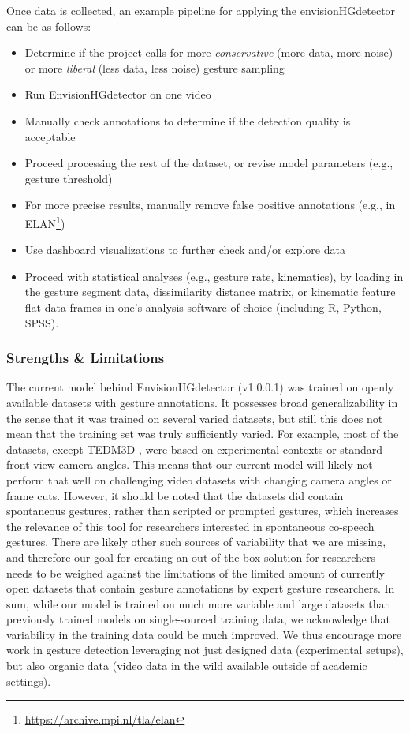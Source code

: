\documentclass[11pt,smallheadings,cleardoublepage=empty,tocflat,numbers=noenddot,twoside,captions=tableheading]{scrbook}
\begin{document}
\begin{refsection}
Once data is collected, an example pipeline for applying the envisionHGdetector can be as follows:
\begin{itemize}
\item Determine if the project calls for more \textit{conservative} (more data, more noise) or more \textit{liberal} (less data, less noise) gesture sampling
\item Run EnvisionHGdetector on one video
\item Manually check annotations to determine if the detection quality is acceptable
\item Proceed processing the rest of the dataset, or revise model parameters (e.g., gesture threshold)
\item For more precise results, manually remove false positive annotations (e.g., in ELAN\footnote{\url{https://archive.mpi.nl/tla/elan}})
\item Use dashboard visualizations to further check and/or explore data 
\item Proceed with statistical analyses (e.g., gesture rate, kinematics), by loading in the gesture segment data, dissimilarity distance matrix, or kinematic feature flat data frames in one's analysis software of choice (including R, Python, SPSS).
\end{itemize}

\subsubsection{Strengths \& Limitations}
The current model behind EnvisionHGdetector (v1.0.0.1) was trained on openly available datasets with gesture annotations. It possesses broad generalizability in the sense that it was trained on several varied datasets, but still this does not mean that the training set was truly sufficiently varied. For example, most of the datasets, except TEDM3D \parencite{rohrerTemporalPragmaticAnalysis2022}, were based on experimental contexts or standard front-view camera angles. This means that our current model will likely not perform that well on challenging video datasets with changing camera angles or frame cuts. However, it should be noted that the datasets did contain spontaneous gestures, rather than scripted or prompted gestures, which increases the relevance of this tool for researchers interested in spontaneous co-speech gestures. There are likely other such sources of variability that we are missing, and therefore our goal for creating an out-of-the-box solution for researchers needs to be weighed against the limitations of the limited amount of currently open datasets that contain gesture annotations by expert gesture researchers. In sum, while our model is trained on much more variable and large datasets than previously trained models on single-sourced training data, we acknowledge that variability in the training data could be much improved. We thus encourage more work in gesture detection leveraging not just designed data (experimental setups), but also organic data (video data in the wild available outside of academic settings).


\end{refsection}
\end{document}
